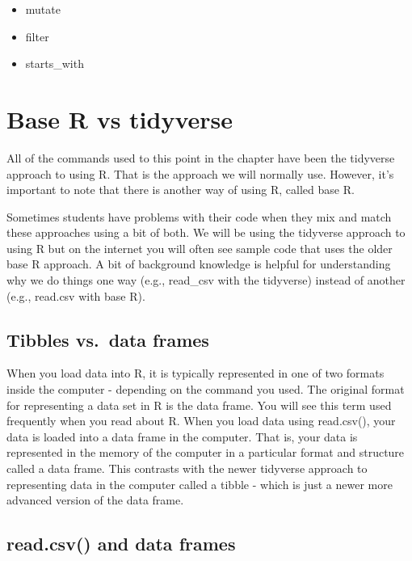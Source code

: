 \documentclass[
]{krantz}
\providecommand{\tightlist}{%
  \setlength{\itemsep}{0pt}\setlength{\parskip}{0pt}}
\begin{document}
\begin{itemize}
\tightlist
\item
  mutate
\item
  filter
\item
  starts\_with
\end{itemize}

\hypertarget{base-r-vs-tidyverse}{%
\section{Base R vs tidyverse}\label{base-r-vs-tidyverse}}

All of the commands used to this point in the chapter have been the tidyverse approach to using R. That is the approach we will normally use. However, it's important to note that there is another way of using R, called base R.

Sometimes students have problems with their code when they mix and match these approaches using a bit of both. We will be using the tidyverse approach to using R but on the internet you will often see sample code that uses the older base R approach. A bit of background knowledge is helpful for understanding why we do things one way (e.g., read\_csv with the tidyverse) instead of another (e.g., read.csv with base R).

\hypertarget{tibbles-vs.-data-frames}{%
\subsection{Tibbles vs.~data frames}\label{tibbles-vs.-data-frames}}

When you load data into R, it is typically represented in one of two formats inside the computer - depending on the command you used. The original format for representing a data set in R is the data frame. You will see this term used frequently when you read about R. When you load data using read.csv(), your data is loaded into a data frame in the computer. That is, your data is represented in the memory of the computer in a particular format and structure called a data frame. This contrasts with the newer tidyverse approach to representing data in the computer called a tibble - which is just a newer more advanced version of the data frame.

\hypertarget{read.csv-and-data-frames}{%
\subsection{read.csv() and data frames}\label{read.csv-and-data-frames}}
\end{document}
